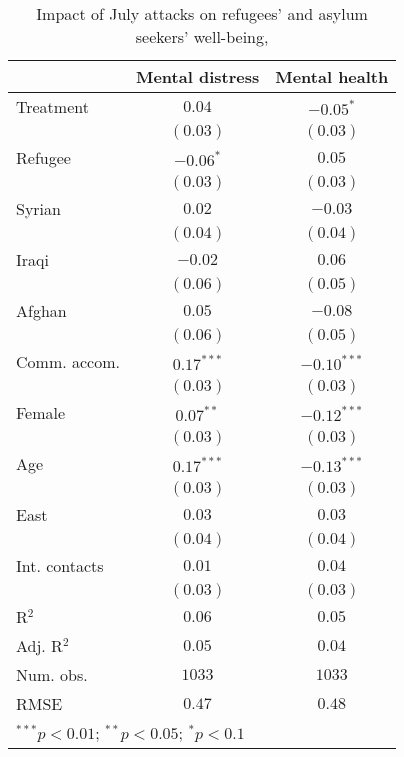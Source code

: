 
\begin{table}
\caption{Impact of July attacks on refugees' and asylum seekers' well-being, }
\begin{center}
\begin{tabular}{l c c}
\toprule
 & Mental distress & Mental health \\
\midrule
Treatment     & $0.04$       & $-0.05^{*}$   \\
              & $(0.03)$     & $(0.03)$      \\
Refugee       & $-0.06^{*}$  & $0.05$        \\
              & $(0.03)$     & $(0.03)$      \\
Syrian        & $0.02$       & $-0.03$       \\
              & $(0.04)$     & $(0.04)$      \\
Iraqi         & $-0.02$      & $0.06$        \\
              & $(0.06)$     & $(0.05)$      \\
Afghan        & $0.05$       & $-0.08$       \\
              & $(0.06)$     & $(0.05)$      \\
Comm. accom.  & $0.17^{***}$ & $-0.10^{***}$ \\
              & $(0.03)$     & $(0.03)$      \\
Female        & $0.07^{**}$  & $-0.12^{***}$ \\
              & $(0.03)$     & $(0.03)$      \\
Age           & $0.17^{***}$ & $-0.13^{***}$ \\
              & $(0.03)$     & $(0.03)$      \\
East          & $0.03$       & $0.03$        \\
              & $(0.04)$     & $(0.04)$      \\
Int. contacts & $0.01$       & $0.04$        \\
              & $(0.03)$     & $(0.03)$      \\
\midrule
R$^2$         & $0.06$       & $0.05$        \\
Adj. R$^2$    & $0.05$       & $0.04$        \\
Num. obs.     & $1033$       & $1033$        \\
RMSE          & $0.47$       & $0.48$        \\
\bottomrule
\multicolumn{3}{l}{\scriptsize{$^{***}p<0.01$; $^{**}p<0.05$; $^{*}p<0.1$}}
\end{tabular}
\label{tab_mhealth}
\end{center}
\end{table}
